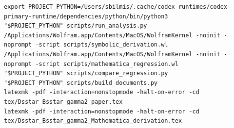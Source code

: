 \documentclass[10pt,a4paper]{article}
\begin{document}
\begin{lstlisting}
export PROJECT_PYTHON=/Users/sbilmis/.cache/codex-runtimes/codex-primary-runtime/dependencies/python/bin/python3
"$PROJECT_PYTHON" scripts/run_analysis.py
/Applications/Wolfram.app/Contents/MacOS/WolframKernel -noinit -noprompt -script scripts/symbolic_derivation.wl
/Applications/Wolfram.app/Contents/MacOS/WolframKernel -noinit -noprompt -script scripts/mathematica_regression.wl
"$PROJECT_PYTHON" scripts/compare_regression.py
"$PROJECT_PYTHON" scripts/build_documents.py
latexmk -pdf -interaction=nonstopmode -halt-on-error -cd tex/Dsstar_Bsstar_gamma2_paper.tex
latexmk -pdf -interaction=nonstopmode -halt-on-error -cd tex/Dsstar_Bsstar_gamma2_Mathematica_derivation.tex
\end{lstlisting}
\end{document}
